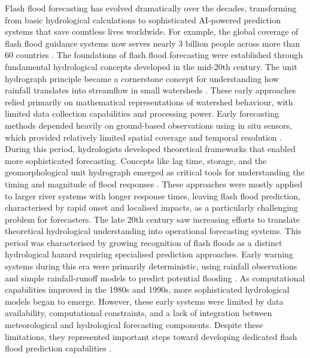 Flash  flood forecasting has evolved dramatically over the decades, transforming from basic hydrological calculations to sophisticated AI-powered prediction systems that save countless lives worldwide. For example, the global coverage of flash flood guidance systems now serves nearly 3 billion people across more than 60 countries \citep{Georgakakos2021}. The foundations of flash flood forecasting were established through fundamental hydrological concepts developed in the mid-20th century. The unit hydrograph principle became a cornerstone concept for understanding how rainfall translates into streamflow in small watersheds \citep{Rigon2016}. These early approaches relied primarily on mathematical representations of watershed behaviour, with limited data collection capabilities and processing power. Early forecasting methods depended heavily on ground-based observations using in situ sensors, which provided relatively limited spatial coverage and temporal resolution \citep{Tao2024}. During this period, hydrologists developed theoretical frameworks that enabled more sophisticated forecasting. Concepts like lag time, storage, and the geomorphological unit hydrograph emerged as critical tools for understanding the timing and magnitude of flood responses \citep{Rigon2016}. These approaches were mostly applied to larger river systems with longer response times, leaving flash flood prediction, characterised by rapid onset and localised impacts, as a particularly challenging problem for forecasters. The late 20th century saw increasing efforts to translate theoretical hydrological understanding into operational forecasting systems. This period was characterised by growing recognition of flash floods as a distinct hydrological hazard requiring specialised prediction approaches. Early warning systems during this era were primarily deterministic, using rainfall observations and simple rainfall-runoff models to predict potential flooding \citep{Hapuarachchi2011}. As computational capabilities improved in the 1980s and 1990s, more sophisticated hydrological models began to emerge. However, these early systems were limited by data availability, computational constraints, and a lack of integration between meteorological and hydrological forecasting components. Despite these limitations, they represented important steps toward developing dedicated flash flood prediction capabilities \citep{Hapuarachchi2011}.

